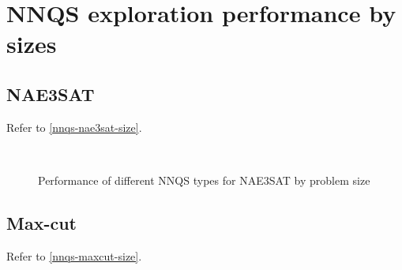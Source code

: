 \chapter{NNQS exploration performance by sizes}\label{appendix:nnqssizegraph}

\section{NAE3SAT}
Refer to \autoref{nnqs-nae3sat-size}.

\begin{figure}[!htb]
    \centering
    \\
    \caption{Performance of different NNQS types for NAE3SAT by problem size}
    \label{nnqs-nae3sat-size}
\end{figure}

\section{Max-cut}
Refer to \autoref{nnqs-maxcut-size}.

